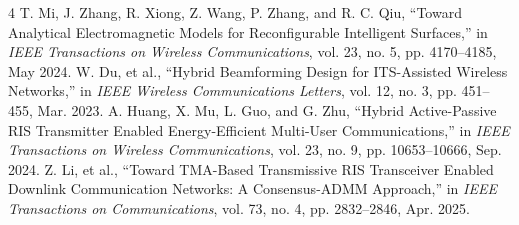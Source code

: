 \documentclass[journal,comsoc]{IEEEtran}
\begin{document}
\begin{thebibliography}{4} %
	T. Mi, J. Zhang, R. Xiong, Z. Wang, P. Zhang, and R. C. Qiu, ``Toward Analytical Electromagnetic Models for Reconfigurable Intelligent Surfaces,'' in \textit{IEEE Transactions on Wireless Communications}, vol. 23, no. 5, pp. 4170--4185, May 2024.
	W. Du, et al., ``Hybrid Beamforming Design for ITS-Assisted Wireless Networks,'' in \textit{IEEE Wireless Communications Letters}, vol. 12, no. 3, pp. 451--455, Mar. 2023.
	A. Huang, X. Mu, L. Guo, and G. Zhu, ``Hybrid Active-Passive RIS Transmitter Enabled Energy-Efficient Multi-User Communications,'' in \textit{IEEE Transactions on Wireless Communications}, vol. 23, no. 9, pp. 10653--10666, Sep. 2024.
	Z. Li, et al., ``Toward TMA-Based Transmissive RIS Transceiver Enabled Downlink Communication Networks: A Consensus-ADMM Approach,'' in \textit{IEEE Transactions on Communications}, vol. 73, no. 4, pp. 2832--2846, Apr. 2025.
\end{thebibliography}
\end{document}
